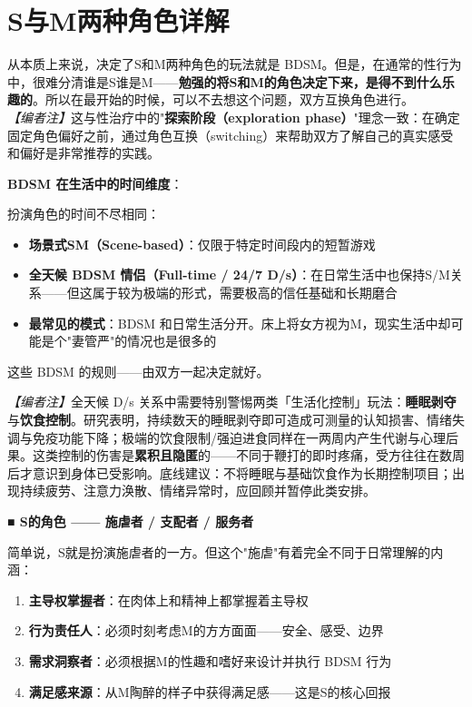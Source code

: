 \documentclass[12pt,UTF8]{ctexbook}
\begin{document}
\section{S与M两种角色详解}

从本质上来说，决定了S和M两种角色的玩法就是 BDSM。但是，在通常的性行为中，很难分清谁是S谁是M——\textbf{勉强的将S和M的角色决定下来，是得不到什么乐趣的}。所以在最开始的时候，可以不去想这个问题，双方互换角色进行。\textit{【编者注】}这与性治疗中的"\textbf{探索阶段（exploration phase）}"理念一致：在确定固定角色偏好之前，通过角色互换（switching）来帮助双方了解自己的真实感受和偏好是非常推荐的实践。

\noindent\textbf{BDSM 在生活中的时间维度}：

扮演角色的时间不尽相同：
\begin{itemize}
	\item \textbf{场景式SM（Scene-based）}：仅限于特定时间段内的短暂游戏
	\item \textbf{全天候 BDSM 情侣（Full-time / 24/7 D/s）}：在日常生活中也保持S/M关系——但这属于较为极端的形式，需要极高的信任基础和长期磨合
	\item \textbf{最常见的模式}：BDSM 和日常生活分开。床上将女方视为M，现实生活中却可能是个"妻管严"的情况也是很多的
\end{itemize}

这些 BDSM 的规则——由双方一起决定就好。

\noindent\textit{【编者注】}全天候 D/s 关系中需要特别警惕两类「生活化控制」玩法：\textbf{睡眠剥夺}与\textbf{饮食控制}。研究表明，持续数天的睡眠剥夺即可造成可测量的认知损害、情绪失调与免疫功能下降；极端的饮食限制/强迫进食同样在一两周内产生代谢与心理后果。这类控制的伤害是\textbf{累积且隐匿}的——不同于鞭打的即时疼痛，受方往往在数周后才意识到身体已受影响。底线建议：不将睡眠与基础饮食作为长期控制项目；出现持续疲劳、注意力涣散、情绪异常时，应回顾并暂停此类安排。

\noindent\textbf{■ S的角色 —— 施虐者 / 支配者 / 服务者}

简单说，S就是扮演施虐者的一方。但这个"施虐"有着完全不同于日常理解的内涵：

\begin{enumerate}
	\item \textbf{主导权掌握者}：在肉体上和精神上都掌握着主导权
	\item \textbf{行为责任人}：必须时刻考虑M的方方面面——安全、感受、边界
	\item \textbf{需求洞察者}：必须根据M的性趣和嗜好来设计并执行 BDSM 行为
	\item \textbf{满足感来源}：从M陶醉的样子中获得满足感——这是S的核心回报
\end{enumerate}
\end{document}
